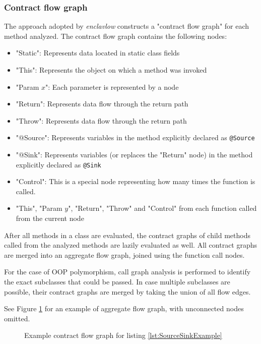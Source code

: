 \documentclass[a4paper, 12pt]{article}
\def\pname{\emph{enclavlow}}
\def\code#1{\colorbox{code}{\texttt{\footnotesize #1}}}
\begin{document}
\subsubsection{Contract flow graph}
The approach adopted by \pname{} constructs a "contract flow graph" for each method analyzed.
The contract flow graph contains the following nodes:
\begin{itemize}
	\item "Static": Represents data located in static class fields
	\item "This": Represents the object on which a method was invoked
	\item "Param $x$": Each parameter is represented by a node
	\item "Return": Represents data flow through the return path
	\item "Throw": Represents data flow through the return path
	\item "@Source": Represents variables in the method explicitly declared as \code{@Source}
	\item "@Sink": Represents variables (or replaces the "Return" node) in the method explicitly declared as \code{@Sink}
	\item "Control": This is a special node representing how many times the function is called.
	\item "This", "Param $y$", "Return", "Throw" and "Control" from each function called from the current node
\end{itemize}

After all methods in a class are evaluated,
the contract graphs of child methods called from the analyzed methods
are lazily evaluated as well.
All contract graphs are merged into an aggregate flow graph,
joined using the function call nodes.

For the case of OOP polymorphism,
call graph analysis is performed to identify
the exact subclasses that could be passed.
In case multiple subclasses are possible,
their contract graphs are merged by taking the union of all flow edges.

See Figure \ref{fig:SourceSinkContract} for an example of aggregate flow graph,
with unconnected nodes omitted.

\begin{figure}
	\caption{Example contract flow graph for listing \ref{lst:SourceSinkExample}}
	\label{fig:SourceSinkContract}
	\begin{center}
	\end{center}
\end{figure}
\end{document}
